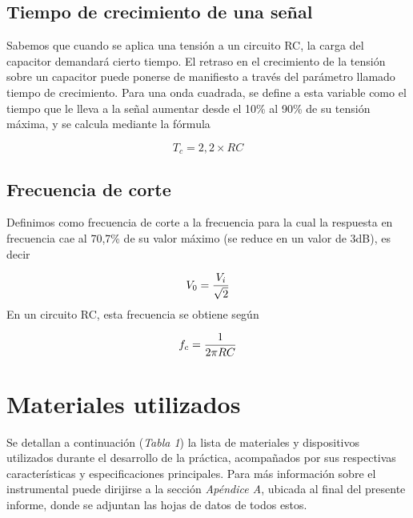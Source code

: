 \documentclass{article}
\begin{document}
\subsection{Tiempo de crecimiento de una señal}

	Sabemos que cuando se aplica una tensión a un circuito RC, la carga del capacitor demandará cierto tiempo. El retraso en el crecimiento de la tensión sobre un capacitor puede ponerse de manifiesto a través del parámetro llamado tiempo de crecimiento. Para una onda cuadrada, se define a esta variable como el tiempo que le lleva a la señal aumentar desde el 10\% al 90\% de su tensión máxima, y se calcula mediante la fórmula

\begin{equation*}
	T_c = 2,2 \times RC
\end{equation*}
\smallskip


\subsection{Frecuencia de corte}

Definimos como frecuencia de corte a la frecuencia para la cual la respuesta en frecuencia cae al 70,7\% de su valor máximo (se reduce en un valor de 3dB), es decir

\begin{equation*}
	V_0 = {V_i \over \sqrt{2}}
\end{equation*}
\medskip
\noindent En un circuito RC, esta frecuencia se obtiene según
\medskip

\begin{equation*}
	f_c = {1 \over 2 \pi RC}
\end{equation*}
\medskip

\bigskip\bigskip




\section{Materiales utilizados}

	Se detallan a continuación (\textit{Tabla 1}) la lista de materiales y dispositivos utilizados durante el desarrollo de la práctica, acompañados por sus respectivas características y especificaciones principales. Para más información sobre el instrumental puede dirijirse a la sección \textit{Apéndice A}, ubicada al final del presente informe, donde se adjuntan las hojas de datos de todos estos.
\bigskip\bigskip
\end{document}
